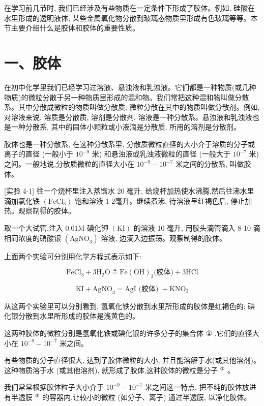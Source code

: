 \documentclass[10pt]{article}
\begin{document}
在学习前几节时, 我们已经涉及有些物质在一定条件下形成了胶体。例如, 硅酸在水里形成的透明液体; 某些金属氧化物分散到玻璃态物质里形成有色玻璃等等。本节主要介绍什么是胶体和胶体的重要性质。

\section*{一、胶体}

在初中化学里我们已经学习过溶液、悬浊液和乳浊液。它们都是一种物质(或几种物质)的微粒分散于另一种物质里形成的混和物。我们常把这种混和物叫做分散系。其中分散成微粒的物质叫做分散质; 微粒分散在其中的物质叫做分散剂。例如, 对溶液来说, 溶质是分散质, 溶剂是分散剂, 溶液是一种分散系。悬浊液和乳浊液也是一种分散系, 其中的固体小颗粒或小液滴是分散质, 所用的溶剂是分散剂。

胶体也是一种分散系, 在这种分散系里, 分散质微粒直径的大小介于溶质的分子或离子的直径 (一般小于 \({10}^{-9}\) 米) 和悬浊液或乳浊液微粒的直径 (一般大于 \({10}^{-7}\) 米) 之间。一般地说,分散质微粒的直径大小在 \({10}^{-9} - {10}^{-7}\) 米之间的分散系, 叫做胶体。

[实验 4-1] 往一个烧杯里注入蒸馏水 20 毫升, 给烧杯加热使水沸腾,然后往沸水里滴加氯化铁 \(\left( {\mathrm{{FeCl}}}_{3}\right)\) 饱和溶液 1-2毫升。继续煮沸, 待溶液呈红褐色后, 停止加热。观察制得的胶体。

取一个大试管,注入 \({0.01}\mathrm{M}\) 碘化钾 \(\left( \mathrm{{KI}}\right)\) 的溶液 10 毫升, 用胶头滴管滴入 8-10 滴相同浓度的硝酸银 \(\left( {\mathrm{{AgNO}}}_{3}\right)\) 溶液, 边滴入边振荡。观察制得的胶体。

上面两个实验可分别用化学方程式表示如下:

\[
{\mathrm{{FeCl}}}_{3} + 3{\mathrm{H}}_{2}\mathrm{O} \triangleq \mathrm{{Fe}}{\left( \mathrm{{OH}}\right) }_{3}\text{(胶体)} + 3\mathrm{{HCl}}
\]

\[
\mathrm{{KI}} + {\mathrm{{AgNO}}}_{3} = \mathrm{{AgI}}\text{ (胶体) } + {\mathrm{{KNO}}}_{3}
\]

从这两个实验里可以分别看到, 氢氧化铁分散到水里所形成的胶体是红褐色的; 碘化银分散到水里所形成的胶体是浅黄色的。

这两种胶体的微粒分别是氢氧化铁或碘化银的许多分子的集合体 \(\text{①}\) ,它们的直径大小在 \({10}^{-9} - {10}^{-7}\) 米之间。

有些物质的分子直径很大, 达到了胶体微粒的大小, 并且能溶解于水(或其他溶剂)。这种物质溶于水 (或其他溶剂), 就形成了胶体,这种胶体的微粒是分子 \({}^{\text{②}}\) 。

我们常常根据胶体粒子大小介于 \({10}^{-9} - {10}^{-7}\) 米之间这一特点, 把不纯的胶体放进有半透膜 \({}^{\text{③}}\) 的容器内,让较小的微粒 (如分子、离子) 通过半透膜, 以净化胶体。
\end{document}
